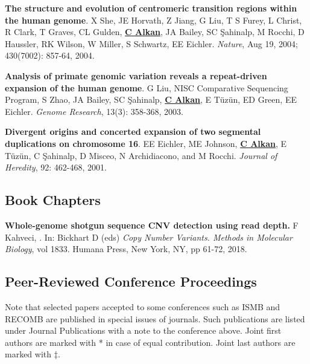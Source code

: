 \vspace{-.2cm}
  {\bf The structure and evolution of centromeric transition regions within
    the human genome}.
  X She, JE Horvath, Z Jiang, G Liu, T S Furey,
  L Christ, R Clark, T Graves, CL Gulden, {\bf \underline{C Alkan}}, JA Bailey, SC \c{S}ahinalp, 
  M Rocchi, D Haussler, RK Wilson, W Miller, S Schwartz, EE Eichler.
  {\em Nature}, Aug 19, 2004; 430(7002): 857-64, 2004.


\vspace{-.2cm}
  {\bf Analysis of primate genomic variation reveals a repeat-driven 
    expansion of the human genome}.
  G Liu, NISC Comparative Sequencing Program, S Zhao, JA Bailey, 
  SC \c{S}ahinalp, {\bf \underline{C Alkan}}, E T\"{u}z\"{u}n, ED Green, EE Eichler.
  {\em Genome Research}, 13(3): 358-368, 2003.

\vspace{-.2cm}
  {\bf Divergent origins and concerted expansion of two segmental
    duplications on 
    chromosome 16}.
  EE Eichler, ME Johnson, {\bf \underline{C Alkan}}, E T\"{u}z\"{u}n, C \c{S}ahinalp,
    D Misceo, 
    N Archidiacono, and M Rocchi.
    {\em Journal of Heredity}, 92: 462-468, 2001.


\vspace{-.4cm}
\subsection{\small \sc  Book Chapters}
\vspace{-.4cm}


       {\bf Whole-genome shotgun sequence CNV detection using read depth.}
       F Kahveci, \calkan{}.
       In: Bickhart D (eds) {\em Copy Number Variants. Methods in Molecular Biology}, vol 1833. Humana Press, New York, NY, pp 61-72, 2018.



\vspace{-.4cm}
\subsection{\small \sc  Peer-Reviewed Conference Proceedings}
\vspace{-.4cm}
       {\small
Note that selected papers accepted to some conferences such as ISMB and RECOMB are published
in special issues of journals. Such publications are listed under Journal Publications with a note to the conference above.
Joint first authors are marked with * in case of equal contribution.
Joint last authors are marked with $\ddag$.
}


